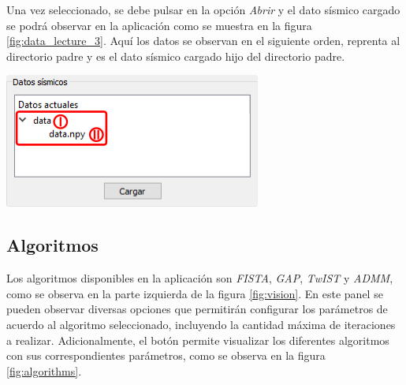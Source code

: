 \documentclass[12pt,oneside,a4]{article}
\newcommand*\circled[1]{\tikz[baseline=(char.base)]{
            \node[shape=circle,draw,inner sep=2pt] (char) {#1};}}
\newenvironment{Figure}
  {\par\medskip\noindent\minipage{\linewidth}}
  {\endminipage\par\medskip}
\begin{document}
\begin{multicols}{2}

Una vez seleccionado, se debe pulsar en la opción \emph{Abrir} y el dato sísmico cargado se podrá observar en la aplicación como se muestra en la figura \ref{fig:data_lecture_3}. Aquí los datos se observan en el siguiente orden, \circled{I} reprenta al directorio padre y \circled{II} es el dato sísmico cargado hijo del directorio padre.

\begin{Figure}
    \centering
    \includegraphics[width=0.7\linewidth]{data-lecture-3.png}
    \label{fig:data_lecture_3}
\end{Figure}

\end{multicols}

\subsection{Algoritmos}

Los algoritmos disponibles en la aplicación son \emph{FISTA}, \emph{GAP}, \emph{TwIST} y \emph{ADMM}, como se observa en la parte izquierda \circled{3} de la figura \ref{fig:vision}. En este panel se pueden observar diversas opciones que permitirán configurar los parámetros de acuerdo al algoritmo seleccionado, incluyendo la cantidad máxima de iteraciones a realizar. Adicionalmente, el botón \hspace{0.5mm} \faEye \hspace{0.5mm} permite visualizar los diferentes algoritmos con sus correspondientes parámetros, como se observa en la figura \ref{fig:algorithms}.
\end{document}
